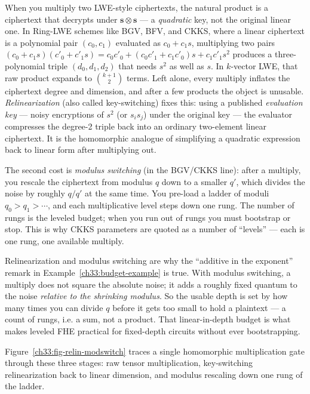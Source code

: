 When you multiply two LWE-style ciphertexts, the natural product is a ciphertext that decrypts under $\mathbf{s}\otimes\mathbf{s}$ --- a \emph{quadratic} key, not the original linear one. In Ring-LWE schemes like BGV, BFV, and CKKS, where a linear ciphertext is a polynomial pair $(c_0, c_1)$ evaluated as $c_0 + c_1 s$, multiplying two pairs $(c_0 + c_1 s)(c'_0 + c'_1 s) = c_0 c'_0 + (c_0 c'_1 + c_1 c'_0)s + c_1 c'_1 s^2$ produces a three-polynomial triple $(d_0, d_1, d_2)$ that needs $s^2$ as well as $s$. In $k$-vector LWE, that raw product expands to $\binom{k+1}{2}$ terms. Left alone, every multiply inflates the ciphertext degree and dimension, and after a few products the object is unusable. \emph{Relinearization} (also called key-switching) fixes this: using a published \emph{evaluation key} --- noisy encryptions of $s^2$ (or $s_i s_j$) under the original key --- the evaluator compresses the degree-2 triple back into an ordinary two-element linear ciphertext. It is the homomorphic analogue of simplifying a quadratic expression back to linear form after multiplying out.

The second cost is \emph{modulus switching} (in the BGV/CKKS line): after a multiply, you rescale the ciphertext from modulus $q$ down to a smaller $q'$, which divides the noise by roughly $q/q'$ at the same time. You pre-load a ladder of moduli $q_0 > q_1 > \cdots$, and each multiplicative level steps down one rung. The number of rungs is the leveled budget; when you run out of rungs you must bootstrap or stop. This is why CKKS parameters are quoted as a number of ``levels'' --- each is one rung, one available multiply.

\begin{whybox}
Relinearization and modulus switching are why the ``additive in the exponent'' remark in Example~\ref{ch33:budget-example} is true. With modulus switching, a multiply does not square the absolute noise; it adds a roughly fixed quantum to the noise \emph{relative to the shrinking modulus}. So the usable depth is set by how many times you can divide $q$ before it gets too small to hold a plaintext --- a count of rungs, i.e. a sum, not a product. That linear-in-depth budget is what makes leveled FHE practical for fixed-depth circuits without ever bootstrapping.
\end{whybox}

Figure~\ref{ch33:fig-relin-modswitch} traces a single homomorphic multiplication gate through these three stages: raw tensor multiplication, key-switching relinearization back to linear dimension, and modulus rescaling down one rung of the ladder.


